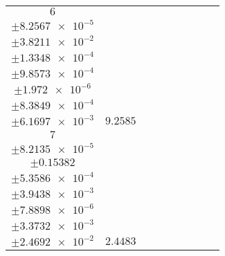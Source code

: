 \documentclass[8pt]{article}
\begin{document}
\begin{longtable}[l]{c c c c c c c c c}
$\num{6}$ & \begin{tabular}[c]{@{}c@{}}$\num{0.12417}$ \\ $\pm\num{8.2567e-5}$\end{tabular} & \begin{tabular}[c]{@{}c@{}}$\num{0.18268}$ \\ $\pm\num{3.8211e-2}$\end{tabular} & \begin{tabular}[c]{@{}c@{}}$\num{7.3995}$ \\ $\pm\num{1.3348e-4}$\end{tabular} & \begin{tabular}[c]{@{}c@{}}$\num{1.3794e+3}$ \\ $\pm\num{9.8573e-4}$\end{tabular} & \begin{tabular}[c]{@{}c@{}}$\num{2.7596}$ \\ $\pm\num{1.972e-6}$\end{tabular} & \begin{tabular}[c]{@{}c@{}}$\num{1.1795}$ \\ $\pm\num{8.3849e-4}$\end{tabular} & \begin{tabular}[c]{@{}c@{}}$\num{4.2234}$ \\ $\pm\num{6.1697e-3}$\end{tabular} & $\num{9.2585}$\\
$\num{7}$ & \begin{tabular}[c]{@{}c@{}}$\num{3.0754e-2}$ \\ $\pm\num{8.2135e-5}$\end{tabular} & \begin{tabular}[c]{@{}c@{}}$\num{0.1763}$ \\ $\pm\num{0.15382}$\end{tabular} & \begin{tabular}[c]{@{}c@{}}$\num{-15.888}$ \\ $\pm\num{5.3586e-4}$\end{tabular} & \begin{tabular}[c]{@{}c@{}}$\num{1.4225e+3}$ \\ $\pm\num{3.9438e-3}$\end{tabular} & \begin{tabular}[c]{@{}c@{}}$\num{2.8458}$ \\ $\pm\num{7.8898e-6}$\end{tabular} & \begin{tabular}[c]{@{}c@{}}$\num{1.1801}$ \\ $\pm\num{3.3732e-3}$\end{tabular} & \begin{tabular}[c]{@{}c@{}}$\num{4.1491}$ \\ $\pm\num{2.4692e-2}$\end{tabular} & $\num{2.4483}$\\

\end{longtable}
\end{document}
